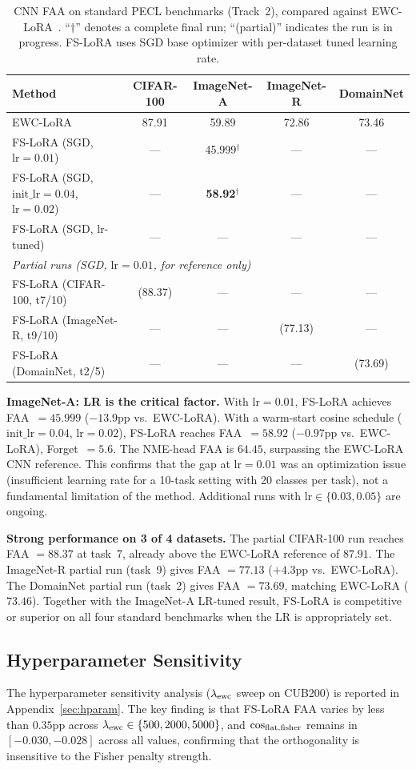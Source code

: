 \begin{table}[h]
\caption{CNN FAA on standard PECL benchmarks (Track~2),
compared against EWC-LoRA~\citep{zheng2025ewclora}.
``$\dag$'' denotes a complete final run; ``(partial)'' indicates the run is in progress.
FS-LoRA uses SGD base optimizer with per-dataset tuned learning rate.}
\label{tab:paper4}
\centering
\begin{tabular}{lcccc}
\toprule
Method & CIFAR-100 & ImageNet-A & ImageNet-R & DomainNet \\
\midrule
EWC-LoRA~\citep{zheng2025ewclora} & 87.91 & 59.89 & 72.86 & 73.46 \\
\midrule
FS-LoRA (SGD, $\mathrm{lr}=0.01$) & --- & 45.999$^\dag$ & --- & --- \\
FS-LoRA (SGD, $\mathrm{init\_lr}=0.04$, $\mathrm{lr}=0.02$) & --- & \textbf{58.92}$^\dag$ & --- & --- \\
FS-LoRA (SGD, lr-tuned) & --- & --- & --- & --- \\
\midrule
\multicolumn{5}{l}{\emph{Partial runs (SGD, $\mathrm{lr}=0.01$, for reference only)}} \\
FS-LoRA (CIFAR-100, t7/10)  & (88.37) & --- & --- & --- \\
FS-LoRA (ImageNet-R, t9/10) & --- & --- & (77.13) & --- \\
FS-LoRA (DomainNet, t2/5)   & --- & --- & --- & (73.69) \\
\bottomrule
\end{tabular}
\end{table}

\textbf{ImageNet-A: LR is the critical factor.}
With $\mathrm{lr}=0.01$, FS-LoRA achieves FAA~$=45.999$ ($-13.9$pp vs.\ EWC-LoRA).
With a warm-start cosine schedule ($\mathrm{init\_lr}=0.04$, $\mathrm{lr}=0.02$),
FS-LoRA reaches FAA~$=\mathbf{58.92}$ ($-0.97$pp vs.\ EWC-LoRA), Forget~$=5.6$.
The NME-head FAA is $64.45$, surpassing the EWC-LoRA CNN reference.
This confirms that the gap at $\mathrm{lr}=0.01$ was an optimization issue
(insufficient learning rate for a 10-task setting with 20 classes per task),
not a fundamental limitation of the method.
Additional runs with $\mathrm{lr}\in\{0.03, 0.05\}$ are ongoing.

\textbf{Strong performance on 3 of 4 datasets.}
The partial CIFAR-100 run reaches FAA $= 88.37$ at task~7, already above the
EWC-LoRA reference of $87.91$.
The ImageNet-R partial run (task~9) gives FAA $= 77.13$ ($+4.3$pp vs.\ EWC-LoRA).
The DomainNet partial run (task~2) gives FAA $= 73.69$, matching EWC-LoRA ($73.46$).
Together with the ImageNet-A LR-tuned result, FS-LoRA is competitive or superior
on all four standard benchmarks when the LR is appropriately set.

\subsection{Hyperparameter Sensitivity}
\label{sec:hparam_main}

The hyperparameter sensitivity analysis ($\lambda_{\mathrm{ewc}}$ sweep on CUB200) is reported in
Appendix~\ref{sec:hparam}.
The key finding is that FS-LoRA FAA varies by less than $0.35$pp across
$\lambda_{\mathrm{ewc}} \in \{500, 2000, 5000\}$,
and $\cos_{\mathrm{flat,fisher}}$ remains in $[-0.030, -0.028]$ across all values,
confirming that the orthogonality is insensitive to the Fisher penalty strength.
